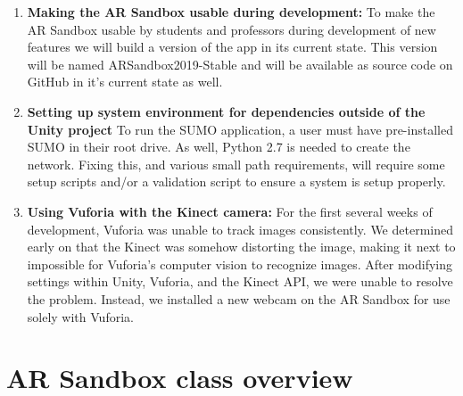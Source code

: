 \documentclass[letterpaper, 10pt, onecolumn, draftclsnofoot]{IEEEtran}
\begin{document}
\begin{enumerate}[label=]
        \item{\textbf{Making the AR Sandbox usable during development:}} 
            To make the AR Sandbox usable by students and professors during development of new features we will build a version of the app in its current state. This version will be named ARSandbox2019-Stable and will be available as source code on GitHub in it's current state as well.
       
        \item{\textbf{Setting up system environment for dependencies outside of the Unity project}}
            To run the SUMO application, a user must have pre-installed SUMO in their root drive. As well, Python 2.7 is needed to create the network. Fixing this, and various small path requirements, will require some setup scripts and/or a validation script to ensure a system is setup properly. 
        
        \item{\textbf{Using Vuforia with the Kinect camera:}} 
            For the first several weeks of development, Vuforia was unable to track images consistently. We determined early on that the Kinect was somehow distorting the image, making it next to impossible for Vuforia's computer vision to recognize images. After modifying settings within Unity, Vuforia, and the Kinect API, we were unable to resolve the problem. Instead, we installed a new webcam on the AR Sandbox for use solely with Vuforia.
    \end{enumerate}
    
\newpage
\section{AR Sandbox class overview}
    
    
    

\newpage
\appendices

\newpage
\nocite{*}


        
\end{document}
